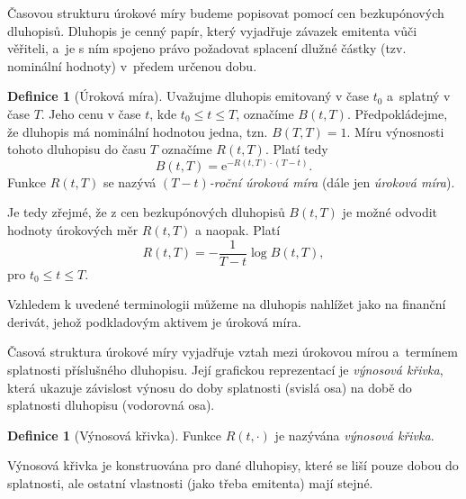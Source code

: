 \documentclass[a4paper,12pt]{report}
\theoremstyle{definition} \newtheorem{definice}[veta]{Definice}
\theoremstyle{remark}
\begin{document}
Časovou strukturu úrokové míry budeme popisovat pomocí cen bezkupónových dluhopisů.
Dluhopis je cenný papír, který vyjadřuje závazek emitenta vůči věřiteli, a~je s ním spojeno právo požadovat splacení dlužné částky (tzv. nominální hodnoty) v~předem určenou dobu.

\begin{definice}[Úroková míra]
Uvažujme dluhopis emitovaný v čase $t_0$ a~splat\-ný v čase $T$.
Jeho cenu v čase $t$, kde $t_0\leq t\leq T$, označíme $B(t,T)$.
Předpokládejme, že dluhopis má nominální hodnotou jedna, tzn. $B(T,T)=1$.
Míru výnosnosti tohoto dluhopisu do času $T$ označíme $R(t,T)$.
Platí tedy
\begin{equation}
B(t,T)=\mathrm{e}^{-R(t,T)\cdot(T-t)}.
\end{equation} 
Funkce $R(t,T)$ se nazývá \textit{$(T-t)$-roční úroková míra} (dále jen \textit{úroková míra}).
\end{definice}
Je tedy zřejmé, že z cen bezkupónových dluhopisů $B(t,T)$ je možné odvodit hodnoty úrokových měr $R(t,T)$ a naopak.
Platí
\begin{equation}\label{urokova_mira_z_dluhopisu_vztah}
R(t,T)=-\frac{1}{T-t}\log B(t,T),
\end{equation} 
pro $t_0\leq t\leq T$.

Vzhledem k uvedené terminologii můžeme na dluhopis nahlížet jako na finanční derivát, jehož podkladovým aktivem je úroková míra.

Časová struktura úrokové míry vyjadřuje vztah mezi úrokovou mírou a~termínem splatnosti příslušného dluhopisu.
Její grafickou reprezentací je \textit{výnosová křivka}, která ukazuje závislost výnosu do doby splatnosti (svislá osa) na době do splatnosti dluhopisu (vodorovná osa). 
\begin{definice}[Výnosová křivka]
Funkce $R(t,\cdot)$ je nazývána \textit{výnosová křivka}.
\end{definice}
Výnosová křivka je konstruována pro dané dluhopisy, které se liší pouze dobou do splatnosti, ale ostatní vlastnosti (jako třeba emitenta) mají stejné.
\end{document}
